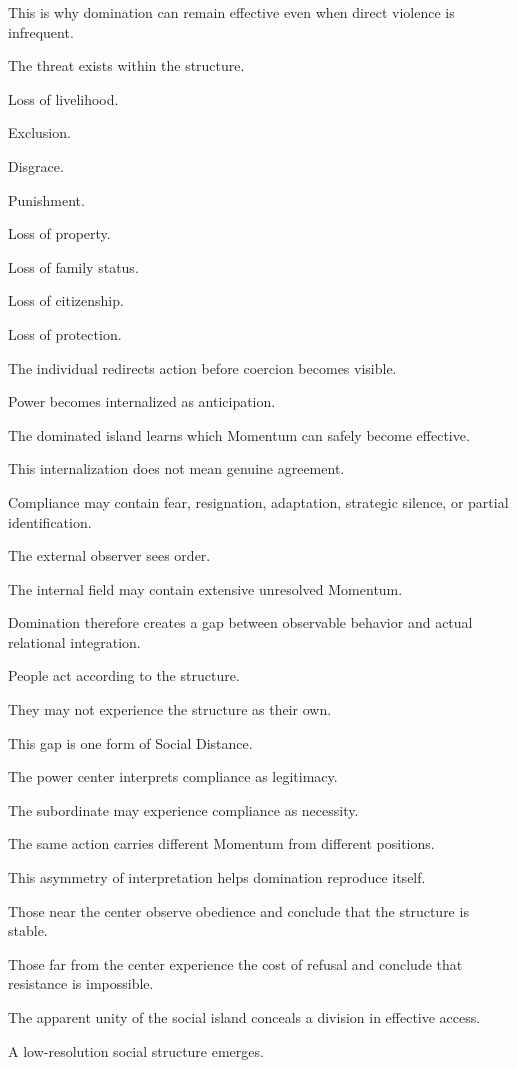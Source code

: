 This is why domination can remain effective even when direct violence is infrequent.

The threat exists within the structure.

Loss of livelihood.

Exclusion.

Disgrace.

Punishment.

Loss of property.

Loss of family status.

Loss of citizenship.

Loss of protection.

The individual redirects action before coercion becomes visible.

Power becomes internalized as anticipation.

The dominated island learns which Momentum can safely become effective.

This internalization does not mean genuine agreement.

Compliance may contain fear, resignation, adaptation, strategic silence, or partial identification.

The external observer sees order.

The internal field may contain extensive unresolved Momentum.

Domination therefore creates a gap between observable behavior and actual relational integration.

People act according to the structure.

They may not experience the structure as their own.

This gap is one form of Social Distance.

The power center interprets compliance as legitimacy.

The subordinate may experience compliance as necessity.

The same action carries different Momentum from different positions.

This asymmetry of interpretation helps domination reproduce itself.

Those near the center observe obedience and conclude that the structure is stable.

Those far from the center experience the cost of refusal and conclude that resistance is impossible.

The apparent unity of the social island conceals a division in effective access.

A low-resolution social structure emerges.

